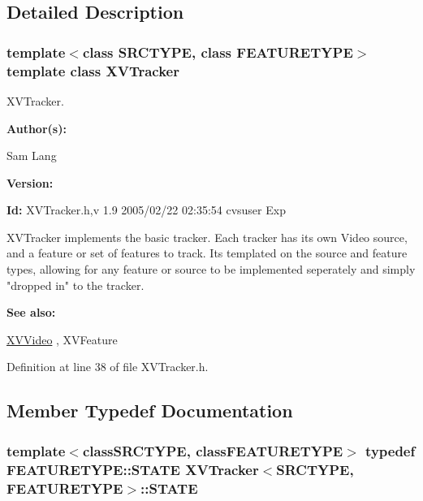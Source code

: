 \subsection{Detailed Description}
\subsubsection*{template$<$class SRCTYPE, class FEATURETYPE$>$  template class XVTracker}

XVTracker.

\begin{Desc}
\item[{\bf Author(s): }]\par
 Sam Lang \end{Desc}
\begin{Desc}
\item[{\bf Version: }]\par
 \end{Desc}
\begin{Desc}
\item[{\bf Id: }] XVTracker.h,v 1.9 2005/02/22 02:35:54 cvsuser Exp \end{Desc}


XVTracker implements the basic tracker. Each tracker has its own Video source, and a feature or set of features to track. Its templated on the source and feature types, allowing for any feature or source to be implemented seperately and simply "dropped in" to the tracker.

\begin{Desc}
\item[{\bf See also: }]\par
 \hyperlink{class_XVVideo}{XVVideo} ,  XVFeature \end{Desc}




Definition at line 38 of file XVTracker.h.

\subsection{Member Typedef Documentation}
\label{XVTracker_u0}
\hypertarget{class_XVTracker_u0}{
\subsubsection[STATE]{\setlength{\rightskip}{0pt plus 5cm}template$<$classSRCTYPE, classFEATURETYPE$>$ typedef FEATURETYPE::STATE XVTracker$<$SRCTYPE, FEATURETYPE$>$::STATE}}




